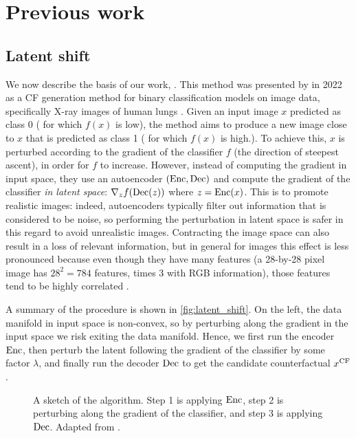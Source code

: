 \documentclass[../main.tex]{subfiles}
\begin{document}
\chapter{Previous work}
\label{ch:previous_work}

\section{Latent shift}

We now describe the basis of our work, \ls{}.
This method was presented by \citeauthor{cohenGifsplanation2022} in 2022 as a CF generation method for binary classification models on image data, specifically X-ray images of human lungs \cite{cohenGifsplanation2022}.
Given an input image $x$ predicted as class 0 (\ie{} for which $f(x)$ is low), the method aims to produce a new image close to $x$ that is predicted as class 1 (\ie{} for which $f(x)$ is high.).
To achieve this, $x$ is perturbed according to the gradient of the classifier $f$ (the direction of steepest ascent), in order for $f$ to increase.
However, instead of computing the gradient in input space, they use an autoencoder $(\operatorname{Enc}, \operatorname{Dec})$ and compute the gradient of the classifier \emph{in latent space}: $\nabla_z f(\operatorname{Dec}(z))$ where $z = \operatorname{Enc}(x)$.
This is to promote realistic images: indeed, autoencoders typically filter out information that is considered to be noise, so performing the perturbation in latent space is safer in this regard to avoid unrealistic images.
Contracting the image space can also result in a loss of relevant information, but in general for images this effect is less pronounced because even though they have many features (a 28-by-28 pixel image has $28^2 = 784$ features, times 3 with RGB information), those features tend to be highly correlated .

A summary of the \ls{} procedure is shown in \autoref{fig:latent_shift}.
On the left, the data manifold in input space is non-convex, so by perturbing along the gradient in the input space we risk exiting the data manifold.
Hence, we first run the encoder $\operatorname{Enc}$, then perturb the latent following the gradient of the classifier by some factor $\lambda$, and finally run the decoder $\operatorname{Dec}$ to get the candidate counterfactual $x^\mathrm{CF}$.

\begin{figure}[htbp]
    \centering

    \caption{A sketch of the \ls{} algorithm. Step 1 is applying $\operatorname{Enc}$, step 2 is perturbing along the gradient of the classifier, and step 3 is applying $\operatorname{Dec}$. Adapted from \cite{cohenGifsplanation2022}.}
    \label{fig:latent_shift}
\end{figure}
\end{document}
